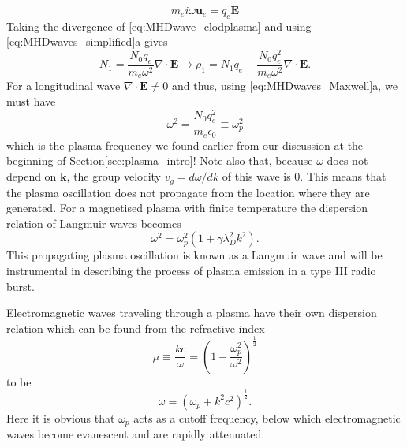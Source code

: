 \begin{equation}
\label{eq:MHDwave_clodplasma}
m_e i \omega \mathbf{u}_e = q_e \mathbf{E}
\end{equation}
Taking the divergence of \ref{eq:MHDwave_clodplasma} and using \ref{eq:MHDwaves_simplified}a gives
\begin{equation}
N_1 = \frac{N_0 q_e}{m_e \omega^2} \nabla \cdot \mathbf{E} \rightarrow \rho_1 = N_1 q_e - \frac{N_0 q_e^2}{m_e \omega^2} \nabla \cdot \mathbf{E}.
\end{equation}
For a longitudinal wave $\nabla \cdot \mathbf{E} \neq 0$ and thus, using \ref{eq:MHDwaves_Maxwell}a, we must have
\begin{equation}
\label{eq:MHDwave_plasmafreq}
\omega^2 = \frac{N_0 q_e^2}{m_e \epsilon_0} \equiv \omega^2_{p}
\end{equation}
which is the plasma frequency we found earlier from our discussion at the beginning of Section\ref{sec:plasma_intro}! Note also that, because $\omega$ does not depend on $\mathbf{k}$, the group velocity $v_g = d\omega / d k$ of this wave is 0. This means that the plasma oscillation does not propagate from the location where they are generated. For a magnetised plasma with finite temperature the dispersion relation of Langmuir waves becomes 
\begin{equation}
\label{eq:MHDwave_langmuir}
\omega^2 = \omega_p^2(1 + \gamma \lambda_D^2k^2).
\end{equation}
This propagating plasma oscillation is known as a Langmuir wave and will be instrumental in describing the process of plasma emission in a type III radio burst.

Electromagnetic waves traveling through a plasma have their own dispersion relation which can be found from the refractive index
\begin{equation}
\mu \equiv \frac{kc}{\omega} = (1 - \frac{\omega_p^2}{\omega^2})^{\frac{1}{2}}
\end{equation}
to be
\begin{equation}
\label{eq:MHDwave_emdispersion}
\omega = (\omega_p +k^2 c^2)^\frac{1}{2}.
\end{equation}
Here it is obvious that $\omega_p$ acts as a cutoff frequency, below which electromagnetic waves become evanescent and are rapidly attenuated.
